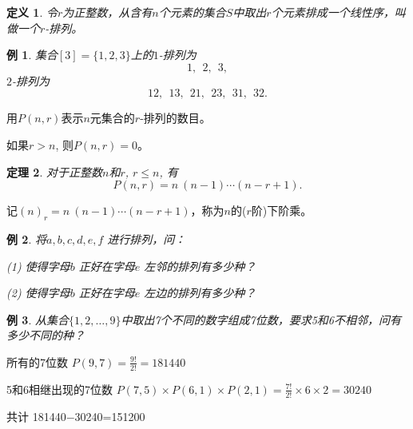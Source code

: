 \documentclass[13pt, punct]{ctexbeamer}
\newtheorem{thm}{定理}[section]
\newtheorem{defi}[thm]{定义}
\newtheorem{ex}{例}[section]
\begin{document}
\begin{frame}

\begin{defi}
	令$r$为正整数，从含有$n$个元素的集合$S$中取出$r$个元素排成一个线性序，叫做一个\alert{$r$-排列}。
\end{defi}

\pause

\begin{ex}
集合$[3]=\{1,2,3\}$上的$1$-排列为 \pause	$$1,~~2,~~3,$$
\pause	$2$-排列为   \pause	$$12,~~13,~~21,~~23,~~31,~~32.$$
\end{ex}
\end{frame}

\begin{frame}
用$P(n,r)$表示$n$元集合的$r$-排列的数目。

如果$r>n$, 则$P(n,r)=0$。

\begin{thm}
	对于正整数$n$和$r$, $r\leq n$, 有
	\[ P(n,r) = n \ (n-1) \cdots  (n-r+1).\]
\end{thm}
记$(n)_r=n \ (n-1) \cdots  (n-r+1)$，称为$n$的($r$阶)\alert{下阶乘}。

\end{frame}

\begin{frame}
    \begin{ex}
将$a, b, c, d, e, f$ 进行排列，问：

(1) 使得字母$b$ 正好在字母$e$ 左邻的排列有多少种？

(2) 使得字母$b$ 正好在字母$e$ 左边的排列有多少种？

    \end{ex}
    \pause

\end{frame}


\begin{frame}
\begin{ex}
从集合$\{1,2,\ldots,9\}$中取出7个不同的数字组成7位数，要求5和6不相邻，问有多少不同的种？

\end{ex}
\pause
所有的7位数
$P(9,7)=\frac{9!}{2!}=181440$

5和6相继出现的7位数
$P(7,5) \times  P(6,1) \times P(2,1) =\frac{7!}{2!}\times 6\times 2=30240$

共计  181440−30240=151200

\end{frame}


%
\end{document}
